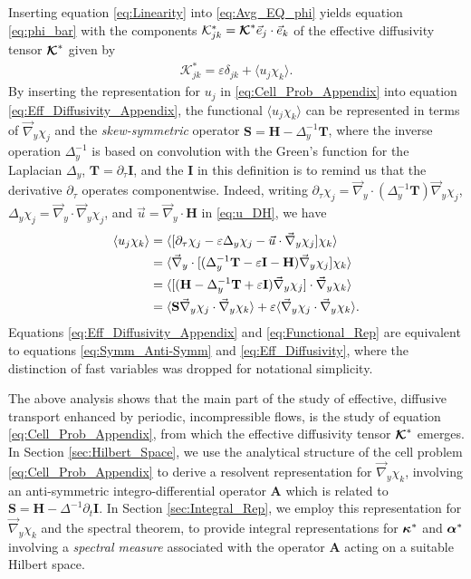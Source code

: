 \documentclass[11pt]{amsart}
\newcommand{\Tb}{\mathbf{T}}
\newcommand{\Hb}{\mathbf{H}}
\newcommand{\Ib}{\mathbf{I}}
\newcommand{\Sb}{\mathbf{S}}
\newcommand{\Ab}{\mathbf{A}}
\newcommand{\Kc}{\mathcal{K}}
\newcommand\Kbc{\mbox{\boldmath${\mathcal{K}}$}}
\newcommand\balpha{\mbox{\boldmath${\alpha}$}}
\newcommand\bkappa{\mbox{\boldmath${\kappa}$}}
\begin{document}
Inserting equation \eqref{eq:Linearity} into \eqref{eq:Avg_EQ_phi}
yields equation \eqref{eq:phi_bar} with the components
$\Kc^*_{jk}=\Kbc^*\vec{e}_j\cdot\vec{e}_k$ of the effective diffusivity
tensor $\Kbc^*$ given by 
%
\begin{align}\label{eq:Eff_Diffusivity_Appendix}
  \Kc^*_{jk}=\varepsilon\delta_{jk}+\langle u_j\chi_k\rangle.
\end{align}
%
By inserting the representation for $u_j$ in
\eqref{eq:Cell_Prob_Appendix} into equation
\eqref{eq:Eff_Diffusivity_Appendix}, the functional $\langle u_j\chi_k\rangle$ can be
represented in terms of $\vec{\nabla}_y\chi_j$ and the \emph{skew-symmetric}
operator $\Sb=\Hb-\Delta_y^{-1}\Tb$, where the inverse operation $\Delta_y^{-1}$
is based on convolution with the Green's function for the Laplacian
$\Delta_y$, $\Tb=\partial_\tau\Ib$, and the $\Ib$ in this definition is to remind us
that the derivative $\partial_\tau$ operates componentwise. Indeed, writing  
$\partial_\tau\chi_j
=\vec{\nabla}_y\cdot(\Delta_y^{-1}\Tb)\vec{\nabla}_y\chi_j$,
$\Delta_y\chi_j=\vec{\nabla}_y\cdot\vec{\nabla}_y\chi_j$, and $\vec{u}=\vec{\nabla}_y\cdot\Hb$ in
\eqref{eq:u_DH}, we have    
%
\begin{align}\label{eq:Functional_Rep}
  \langle u_j\chi_k\rangle&=\langle[\partial_\tau\chi_j-\varepsilon\Delta_y\chi_j-\vec{u}\cdot\vec{\nabla}_y\chi_j]\chi_k\rangle
       \\
       &=\langle\vec{\nabla}_y\cdot[(\Delta_y^{-1}\Tb-\varepsilon\Ib-\Hb)\vec{\nabla}_y\chi_j]\chi_k\rangle
       \notag\\
       &=\langle[(\Hb-\Delta_y^{-1}\Tb+\varepsilon\Ib)\vec{\nabla}_y\chi_j]\cdot\vec{\nabla}_y\chi_k\rangle
       \notag\\
       &=\langle\Sb\vec{\nabla}_y\chi_j\cdot\vec{\nabla}_y\chi_k\rangle+\varepsilon\langle\vec{\nabla}_y\chi_j\cdot\vec{\nabla}_y\chi_k\rangle.
       \notag
\end{align}
%
Equations \eqref{eq:Eff_Diffusivity_Appendix} and
\eqref{eq:Functional_Rep} are equivalent to equations
\eqref{eq:Symm_Anti-Symm} and \eqref{eq:Eff_Diffusivity}, where the
distinction of fast variables was dropped for notational simplicity.





The above analysis shows that the main part of the study of effective, 
diffusive transport enhanced by periodic, incompressible flows, is the
study of equation \eqref{eq:Cell_Prob_Appendix}, from which the
effective diffusivity tensor $\Kbc^*$ emerges. In Section
\ref{sec:Hilbert_Space}, we use the analytical structure of the cell
problem \eqref{eq:Cell_Prob_Appendix} to derive a resolvent
representation for $\vec{\nabla}_y\chi_k$, involving an anti-symmetric
integro-differential operator $\Ab$ which is related to 
$\Sb=\Hb-\Delta^{-1}\partial_t\Ib$. In Section \ref{sec:Integral_Rep}, 
we employ this representation for $\vec{\nabla}_y\chi_k$ and the spectral
theorem, to provide integral representations for $\bkappa^*$ and
$\balpha^*$ involving a \emph{spectral measure} associated with the
operator $\Ab$ acting on a suitable Hilbert space.     
   
\end{document}
